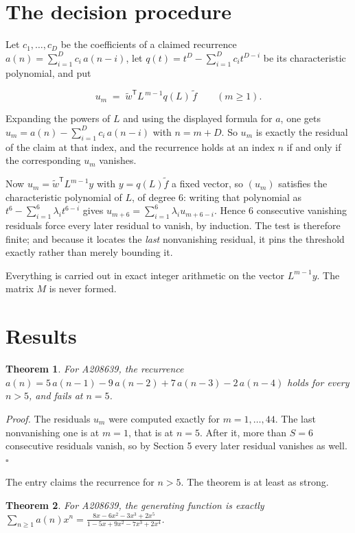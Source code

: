 \documentclass[11pt]{article}
\newtheorem{theorem}{Theorem}
\theoremstyle{definition}
\begin{document}
\section{The decision procedure}

Let $c_1,\dots,c_D$ be the coefficients of a claimed recurrence $a(n) = \sum_{i=1}^{D} c_i\,a(n-i)$, let $q(t) = t^{D} - \sum_{i=1}^{D} c_i t^{D-i}$ be its characteristic polynomial, and put

\[u_m \;=\; \tilde w^{\mathsf T} L^{\,m-1} q(L)\,\tilde f \qquad (m \ge 1).\]

Expanding the powers of $L$ and using the displayed formula for $a$, one gets $u_m = a(n) - \sum_{i=1}^{D} c_i\,a(n-i)$ with $n = m + D$. So $u_m$ is exactly the residual of the claim at that index, and the recurrence holds at an index $n$ if and only if the corresponding $u_m$ vanishes.

Now $u_m = \tilde w^{\mathsf T} L^{m-1} y$ with $y = q(L)\tilde f$ a fixed vector, so $(u_m)$ satisfies the characteristic polynomial of $L$, of degree $6$: writing that polynomial as $t^{6} - \sum_{i=1}^{6} \lambda_i t^{6-i}$ gives $u_{m+6} = \sum_{i=1}^{6} \lambda_i u_{m+6-i}$. Hence $6$ consecutive vanishing residuals force every later residual to vanish, by induction. The test is therefore finite; and because it locates the {\itshape last} nonvanishing residual, it pins the threshold exactly rather than merely bounding it.

Everything is carried out in exact integer arithmetic on the vector $L^{m-1}y$. The matrix $M$ is never formed.

\section{Results}

\begin{theorem} For A208639, the recurrence $a(n) = 5\,a(n-1) - 9\,a(n-2) + 7\,a(n-3) - 2\,a(n-4)$ holds for every $n > 5$, and fails at $n = 5$.\end{theorem}

{\itshape Proof.} The residuals $u_m$ were computed exactly for $m = 1,\dots,44$. The last nonvanishing one is at $m = 1$, that is at $n = 5$. After it, more than $S = 6$ consecutive residuals vanish, so by Section 5 every later residual vanishes as well. $\square$

The entry claims the recurrence for $n > 5$. The theorem is at least as strong.

\begin{theorem} For A208639, the generating function is exactly $\sum_{n\ge 1} a(n)x^n = \frac{8x - 6x^{2} - 3x^{3} + 2x^{5}}{1 - 5x + 9x^{2} - 7x^{3} + 2x^{4}}$.\end{theorem}
\end{document}
